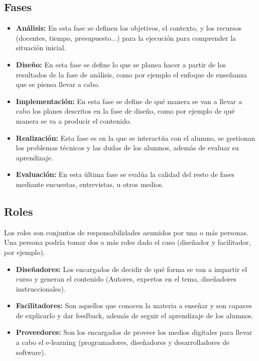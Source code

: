 \subsection{Fases}
\begin{itemize}
	\item \textbf{Análisis:}
	En esta fase se definen los objetivos, el contexto, y los recursos (docentes, tiempo, presupuesto...) para la ejecución para comprender la situación inicial.
	\item \textbf{Diseño:}
	En esta fase se define lo que se planea hacer a partir de los resultados de la fase de análisis, como por ejemplo el enfoque de enseñanza que se piensa llevar a cabo.
	\item \textbf{Implementación:}
	En esta fase se define de qué manera se van a llevar a cabo los planes descritos en la fase de diseño, como por ejemplo de qué manera se va a producir el contenido.
	\item \textbf{Realización:}
	Esta fase es en la que se interactúa con el alumno, se gestionan los problemas técnicos y las dudas de los alumnos, además de evaluar su aprendizaje.
	\item \textbf{Evaluación:}
	En esta última fase se evalúa la calidad del resto de fases mediante encuestas, entrevistas, u otros medios.
\end{itemize}



\subsection{Roles}
Los roles son conjuntos de responsabilidades asumidos por una o más personas. Una persona podría tomar dos o más roles dado el caso (diseñador y facilitador, por ejemplo).
\begin{itemize}
	\item \textbf{Diseñadores:}
	Los encargados de decidir de qué forma se van a impartir el curso y generan el contenido (Autores, expertos en el tema, diseñadores instruccionales).
	\item \textbf{Facilitadores:}
	Son aquellos que conocen la materia a enseñar y son capaces de explicarlo y dar feedback, además de seguir el aprendizaje de los alumnos.
	\item \textbf{Proveedores:}
	Son los encargados de proveer los medios digitales para llevar a cabo el e-learning (programadores, diseñadores y desarrolladores de software).
\end{itemize}


